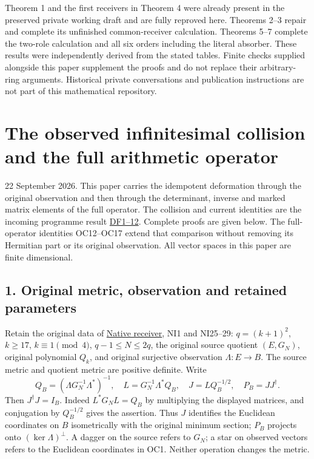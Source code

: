 \documentclass[
]{article}
\begin{document}
Theorem 1 and the first receivers in Theorem 4 were already present in
the preserved private working draft and are fully reproved here.
Theorems 2--3 repair and complete its unfinished common-receiver
calculation. Theorems 5--7 complete the two-role calculation and all six
orders including the literal absorber. These results were independently
derived from the stated tables. Finite checks supplied alongside this
paper supplement the proofs and do not replace their arbitrary-ring
arguments. Historical private conversations and publication instructions
are not part of this mathematical repository.

\section{The observed infinitesimal collision and the full arithmetic
operator}\label{the-observed-infinitesimal-collision-and-the-full-arithmetic-operator}

22 September 2026. This paper carries the idempotent deformation through
the original observation and then through the determinant, inverse and
marked matrix elements of the full operator. The collision and current
identities are the incoming programme result
\href{https://github.com/KokunoYumeto/zeta-function-research-reader/blob/4ba9285b66af58a6d58fc502a494c1fb45ca5b79/workbenches/splitzero-tandem/continuations/20260922-support-transport/OBSERVED_DEFORMATION_AND_CURRENT.md\#L22}{DF1--12}.
Complete proofs are given below. The full-operator identities OC12--OC17
extend that comparison without removing its Hermitian part or its
original observation. All vector spaces in this paper are finite
dimensional.

\subsection{1. Original metric, observation and retained
parameters}\label{original-metric-observation-and-retained-parameters}

Retain the original data of
\href{https://github.com/KokunoYumeto/zeta-function-research-reader/blob/c9df443d9e1df000dfbb083943f97197e746eb08/workbenches/splitzero-tandem/branches/identity-absorber-square/NATIVE_DUAL_NUMBER_RECEIVER.md}{Native
receiver}, NI1 and NI25--29: \(q=(k+1)^2\), \(k\ge17\),
\(k\equiv1\pmod4\), \(q-1\le N\le2q\), the original source quotient
\((E,G_N)\), original polynomial \(Q_k\), and original surjective
observation \(\Lambda:E\to B\). The source metric and quotient metric
are positive definite. Write \[
Q_B=(\Lambda G_N^{-1}\Lambda^*)^{-1},\quad
L=G_N^{-1}\Lambda^*Q_B,\quad J=LQ_B^{-1/2},\quad P_B=JJ^\dagger.
\tag{OC1}
\] Then \(J^\dagger J=I_B\). Indeed \(L^*G_NL=Q_B\) by multiplying the
displayed matrices, and conjugation by \(Q_B^{-1/2}\) gives the
assertion. Thus \(J\) identifies the Euclidean coordinates on \(B\)
isometrically with the original minimum section; \(P_B\) projects onto
\((\ker\Lambda)^\perp\). A dagger on the source refers to \(G_N\); a
star on observed vectors refers to the Euclidean coordinates in OC1.
Neither operation changes the metric.
\end{document}
